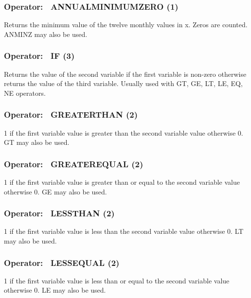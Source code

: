 \subsubsection{Operator:~ ANNUALMINIMUMZERO (1)}\label{operator-annualminimumzero-1}

Returns the minimum value of the twelve monthly values in x. Zeros are counted. ANMINZ may also be used.

\subsubsection{Operator:~ IF (3)}\label{operator-if-3}

Returns the value of the second variable if the first variable is non-zero otherwise returns the value of the third variable. Usually used with GT, GE, LT, LE, EQ, NE operators.

\subsubsection{Operator:~ GREATERTHAN (2)}\label{operator-greaterthan-2}

1 if the first variable value is greater than the second variable value otherwise 0. GT may also be used.

\subsubsection{Operator:~ GREATEREQUAL (2)}\label{operator-greaterequal-2}

1 if the first variable value is greater than or equal to the second variable value otherwise 0. GE may also be used.

\subsubsection{Operator:~ LESSTHAN (2)}\label{operator-lessthan-2}

1 if the first variable value is less than the second variable value otherwise 0. LT may also be used.

\subsubsection{Operator:~ LESSEQUAL (2)}\label{operator-lessequal-2}

1 if the first variable value is less than or equal to the second variable value otherwise 0. LE may also be used.

